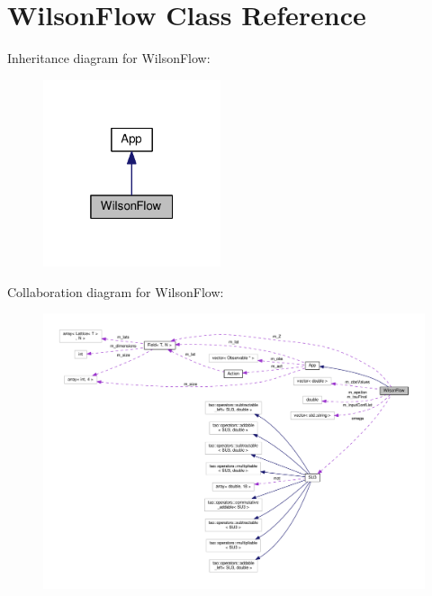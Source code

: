 \hypertarget{classWilsonFlow}{}\section{Wilson\+Flow Class Reference}
\label{classWilsonFlow}


Inheritance diagram for Wilson\+Flow\+:\nopagebreak
\begin{figure}[H]
\begin{center}
\leavevmode
\includegraphics[width=148pt]{d3/d84/classWilsonFlow__inherit__graph}
\end{center}
\end{figure}


Collaboration diagram for Wilson\+Flow\+:
\nopagebreak
\begin{figure}[H]
\begin{center}
\leavevmode
\includegraphics[width=350pt]{d6/da6/classWilsonFlow__coll__graph}
\end{center}
\end{figure}
